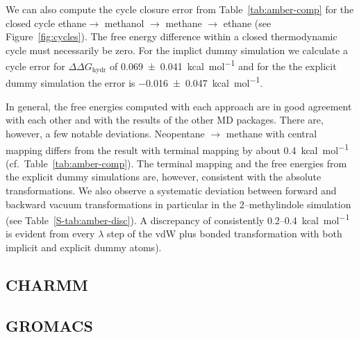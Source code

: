 \documentclass[journal=jctcce,manuscript=article]{achemso}
\begin{document}
We can also compute the cycle closure error from Table~\ref{tab:amber-comp} for the closed cycle ethane$ \rightarrow$ methanol $\rightarrow$ methane $\rightarrow$ ethane (see Figure~\ref{fig:cycles}).  The free energy difference within a closed thermodynamic cycle must necessarily be zero.  For the implict dummy simulation we calculate a cycle error for $\Delta\Delta G_\mathrm{hydr}$ of \SI{0.069+-0.041}{kcal.mol^{-1}} and for the the explicit dummy simulation the error is \SI{-0.016+-0.047}{kcal.mol^{-1}}.

In general, the free energies computed with each approach are in good agreement with each other and with the results of the other MD packages.  There are, however, a few notable deviations.  Neopentane $\rightarrow$ methane with  central mapping differs from the result with terminal mapping by about \SI{0.4}{kcal.mol^{-1}} (cf.\ Table~\ref{tab:amber-comp}).  The terminal mapping and the free energies from the explicit dummy simulations are, however, consistent with the absolute transformations.  We also observe a systematic deviation between forward and backward vacuum transformations in particular in the 2--methylindole simulation (see Table~\ref{S-tab:amber-disc}).
A discrepancy of consistently 0.2--\SI{0.4}{kcal.mol^{-1}} is evident from every $\lambda$ step of the vdW plus bonded transformation with both implicit and explicit dummy atoms).


\subsection{CHARMM}
\label{sec:charmm-results}



\subsection{GROMACS}
\label{sec:gromacs-results}
\end{document}
